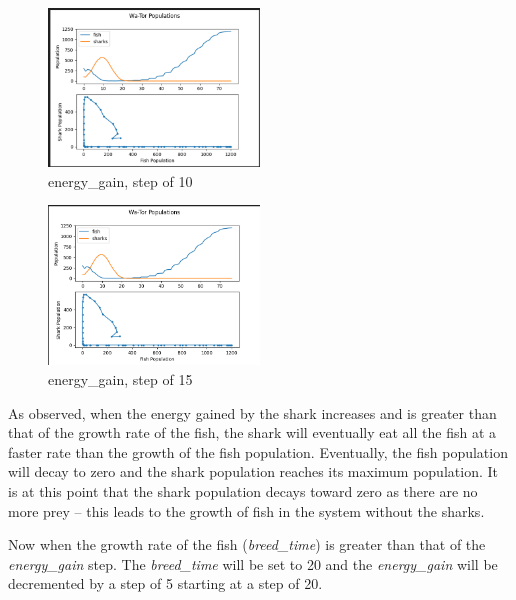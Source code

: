 \documentclass[12pt]{iopart} %
\begin{document}
\begin{figure}[h!tbp]
  \begin{center}
  \item[]\includegraphics[width=0.5\textwidth]{figure15.png}
  \caption{\label{fig:figure15}
  energy\_gain, step of 10
  }
  \end{center}
\end{figure}

\begin{figure}[h!tbp]
  \begin{center}
  \item[]\includegraphics[width=0.5\textwidth]{figure16.png}
  \caption{\label{fig:figure16}
  energy\_gain, step of 15
  }
  \end{center}
\end{figure}

As observed, when the energy gained by the shark increases and is greater than that of the growth rate of the fish, the shark will eventually eat all the fish at a faster rate than the growth of the fish population. 
Eventually, the fish population will decay to zero and the shark population reaches its maximum population. 
It is at this point that the shark population decays toward zero as there are no more prey -- this leads to the growth of fish in the system without the sharks.

Now when the growth rate of the fish (\emph{breed\_time}) is greater than that of the \emph{energy\_gain} step. 
The \emph{breed\_time} will be set to 20 and the \emph{energy\_gain} will be decremented by a step of 5 starting at a step of 20.
\end{document}
